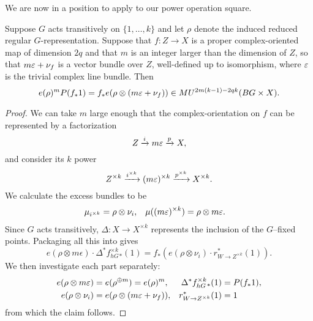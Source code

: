 We are now in a position to apply  to our power operation square.

\begin{lemma}\label{PowerOpAndEulerClasses}
Suppose $G$ acts transitively on $\{1, \ldots, k\}$ and let $\rho$ denote the induced reduced regular $G$-representation. Suppose that $f: Z \to X$ is a proper complex-oriented map of dimension $2q$ and that $m$ is an integer larger than the dimension of $Z$, so that $m \varepsilon + \nu_f$ is a vector bundle over $Z$, well-defined up to isomorphism, where $\varepsilon$ is the trivial complex line bundle. Then \[e(\rho)^m P(f_* 1) = f_* e(\rho \otimes (m \varepsilon + \nu_f)) \in MU^{2m(k-1)-2qk}(BG \times X).\]
\end{lemma}
\begin{proof}
We can take $m$ large enough that the complex-orientation on $f$ can be represented by a factorization \[Z \xrightarrow i m \varepsilon \xrightarrow p X,\] and consider its $k${\th} power \[Z^{\times k} \xrightarrow{i^{\times k}} (m \varepsilon)^{\times k} \xrightarrow{p^{\times k}} X^{\times k}.\]  We calculate the excess bundles to be
\begin{align*}
\mu_{i^{\times k}} & = \rho \otimes \nu_i, &
\mu((m \varepsilon)^{\times k}) & = \rho \otimes m \varepsilon.
\end{align*}
Since $G$ acts transitively, $\Delta: X \to X^{\times k}$ represents the inclusion of the $G$--fixed points.  Packaging all this into  gives \[e(\rho \otimes m\epsilon) \cdot \Delta^* f^{\times k}_{hG}{}_*(1) = f_*(e(\rho \otimes \nu_i) \cdot r_{W \to Z^{\times k}}^*(1)).\]
We then investigate each part separately:
\begin{align*}
e(\rho \otimes m\varepsilon) & = e(\rho^{\oplus m}) = e(\rho)^m, &
\Delta^* f^{\times k}_{hG} {}_*(1) & = P(f_* 1), \\
e(\rho \otimes \nu_i) & = e(\rho \otimes (m \varepsilon + \nu_f)), &
r^*_{W \to Z^{\times k}}(1) & = 1
\end{align*}
from which the claim follows.
\end{proof}

